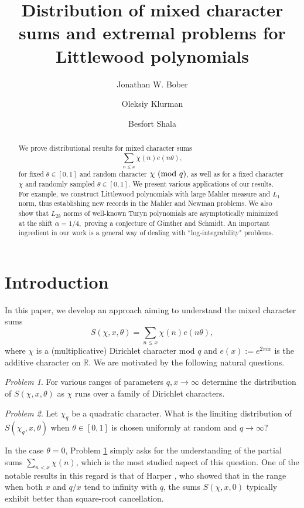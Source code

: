 \documentclass[12pt, a4paper]{amsart}
\title[Mixed character sums and Littlewood polynomials]{Distribution of mixed character sums and extremal problems for Littlewood polynomials}
\author{Jonathan W. Bober}
\author{Oleksiy Klurman}
\author{Besfort Shala}
\theoremstyle{remark}
\newtheorem{problem}{Problem}
\newcommand{\R}{\ensuremath{\mathbb{R}}}
\renewcommand{\mod}[1]{{\ifmmode\text{\rm\ (mod~$#1$)}\else\discretionary{}{}{\hbox{ }}\rm(mod~$#1$)\fi}}
\begin{document}
\begin{abstract}
    We prove distributional results for mixed character sums \begin{equation*}
\sum_{n\le x }\chi(n)e(n\theta),
\end{equation*}
    for fixed $\theta\in [0,1]$ and random character $\chi \mod q$, as well as for
    a fixed character $\chi$ and randomly sampled $\theta\in  [0,1].$ We present
    various applications of our results. For example, we construct Littlewood
    polynomials with large Mahler measure and $L_1$ norm, thus establishing new records in the
    Mahler and Newman problems. We also show that $L_{2k}$ norms of well-known Turyn
    polynomials are asymptotically minimized at the shift $\alpha=1/4,$ proving a conjecture of
    G\"unther and Schmidt. An important ingredient in our work is a general way
    of dealing with ``log-integrability" problems.
\end{abstract}


\maketitle

\thispagestyle{empty}

\section{Introduction}

\newcommand{\Sabt}{S(\chi,\alpha,\beta,\theta)}
In this paper, we develop an approach aiming to understand the mixed
character sums
\begin{equation*}
S(\chi, x, \theta) = \sum_{n\le x }\chi(n)e(n\theta),
\end{equation*}
where $\chi$ is a (multiplicative) Dirichlet character mod $q$ and
$e(x) := e^{2 \pi i x}$ is the additive character on $\R.$ We are motivated by
the following natural questions.
\begin{problem}\label{Q1}
For various ranges of parameters $q,x\to\infty$ determine the distribution of
$S(\chi,x,\theta)$ as $\chi$ runs over a family of Dirichlet characters.
\end{problem}
\begin{problem}\label{Q2}
Let $\chi_q$ be a quadratic character. What is the limiting distribution of
$S(\chi_q,x,\theta)$ when $\theta\in[0,1]$ is chosen uniformly at random and
$q\to\infty$?
\end{problem}

In the case $\theta = 0$, Problem \ref{Q1} simply asks for the understanding
of the partial sums $\sum_{n < x} \chi(n)$, which is the most studied aspect
of this question. One of the notable results in this regard is that of Harper \cite{harper}, who showed that in the range when both $x$ and $q/x$ tend to infinity with $q$, the sums $S(\chi, x, 0)$ typically exhibit better than square-root cancellation. 
\end{document}
